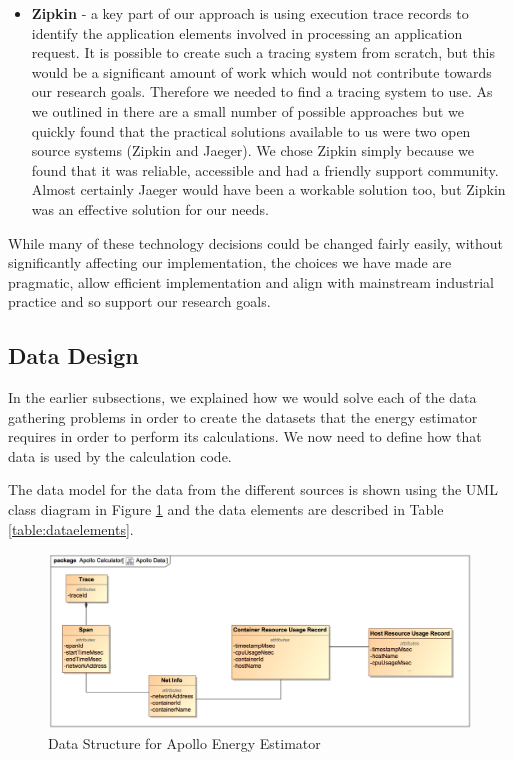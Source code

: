 \begin{itemize}
	\item \textbf{Zipkin} - a key part of our approach is using execution trace records to identify the application elements involved in processing an application request. It is possible to create such a tracing system from scratch, but this would be a significant amount of work which would not contribute towards our research goals.  Therefore we needed to find a tracing system to use.  As we outlined in  there are a small number of possible approaches but we quickly found that the practical solutions available to us were two open source systems (Zipkin and Jaeger).  We chose Zipkin simply because we found that it was reliable, accessible and had a friendly support community.  Almost certainly Jaeger would have been a workable solution too, but Zipkin was an effective solution for our needs.
\end{itemize}

While many of these technology decisions could be changed fairly easily, without significantly affecting our implementation, the choices we have made are pragmatic, allow efficient implementation and align with mainstream industrial practice and so support our research goals.

\subsection{Data Design}
\label{subsection:data-design}

In the earlier subsections, we explained how we would solve each of the data gathering problems in order to create the datasets that the energy estimator requires in order to perform its calculations.  We now need to define how that data is used by the calculation code.

The data model for the data from the different sources is shown using the UML class diagram in Figure \ref{figure:data} and the data elements are described in Table \ref{table:dataelements}.

\begin{figure}
\centering
\includegraphics[width=1.0\textwidth]{Figures/implementation-data}
\caption{Data Structure for Apollo Energy Estimator}
\label{figure:data}
\end{figure}


